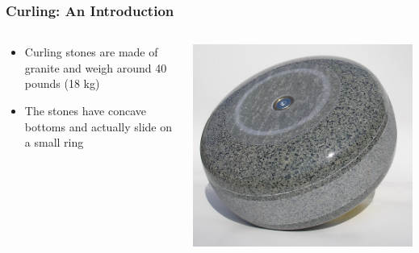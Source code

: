 \documentclass{beamer}
\begin{document}
\begin{frame}\frametitle{Curling: An Introduction}
    \begin{columns}    
        \begin{column}{0.3\textwidth}    
            \begin{itemize}
                \item Curling stones are made of granite and weigh around 40 pounds (18 kg)
                \item The stones have concave bottoms and actually slide on a small ring
            \end{itemize}
        \end{column}
        \begin{column}{0.7\textwidth}    
            \centering
            \includegraphics[width=1.0\textwidth]{Images/Curling_Stone.jpg}
        \end{column}
    \end{columns}    
\end{frame}
\end{document}
